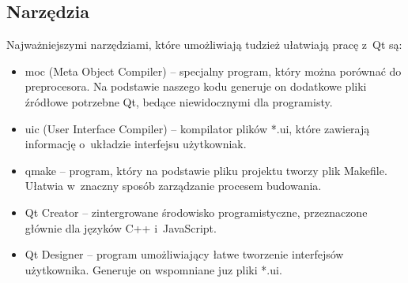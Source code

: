 \subsection{Narzędzia}
Najważniejszymi narzędziami, które umożliwiają tudzież ułatwiają pracę z~Qt są:
\begin{itemize}
\item moc (Meta Object Compiler) -- specjalny program, który można porównać do preprocesora. Na podstawie naszego kodu generuje on dodatkowe pliki źródłowe potrzebne Qt, bedące niewidocznymi dla programisty.
\item uic (User Interface Compiler) -- kompilator plików *.ui, które zawierają informację o~układzie interfejsu użytkowniak.
\item qmake -- program, który na podstawie pliku projektu tworzy plik Makefile. Ułatwia w~znaczny sposób zarządzanie procesem budowania.
\item Qt Creator -- zintergrowane środowisko programistyczne, przeznaczone głównie dla języków C++ i~JavaScript.
\item Qt Designer -- program umożliwiający łatwe tworzenie interfejsów użytkownika. Generuje on wspomniane juz pliki *.ui.
\end{itemize}


